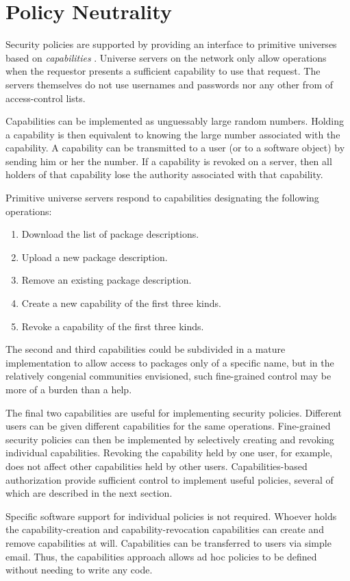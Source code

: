 \documentclass{IEEEtran}
\begin{document}
\section{Policy Neutrality}

Security policies are supported by providing an interface to
primitive universes based on \emph{capabilities} \cite{miller00:caps}.
Universe servers on the network only allow operations when the
requestor presents a sufficient capability to use that request.  The
servers themselves do not use usernames and passwords nor any other
from of access-control lists.

Capabilities can be implemented as unguessably large random numbers.
Holding a capability is then equivalent to knowing the large number
associated with the capability.  A capability can be transmitted to a
user (or to a software object) by sending him or her the number.  If a
capability is revoked on a server, then all holders of that capability
lose the authority associated with that capability.


Primitive universe servers respond to capabilities designating the
following operations:
\begin{enumerate}
\item Download the list of package descriptions.
\item Upload a new package description.
\item Remove an existing package description.
\item Create a new capability of the first three kinds.
\item Revoke a capability of the first three kinds.
\end{enumerate}
The second and third capabilities could be subdivided in a mature
implementation to allow access to packages only of a specific name,
but in the relatively congenial communities envisioned, such
fine-grained control may be more of a burden than a help.


The final two capabilities are useful for implementing security
policies.  Different users can be given different capabilities for the
same operations.  Fine-grained security policies can then be implemented by
selectively creating and revoking individual capabilities.  Revoking
the capability held by one user, for example, does not affect other
capabilities held by other users.
Capabilities-based authorization provide sufficient control to
implement useful policies, several of which are described in the next
section.


Specific software support for individual policies is not required.
Whoever holds the capability-creation and capability-revocation
capabilities can create and remove capabilities at will.  Capabilities
can be transferred to users via simple email.  Thus, the capabilities
approach allows ad hoc policies to be defined without needing to write
any code.
\end{document}
